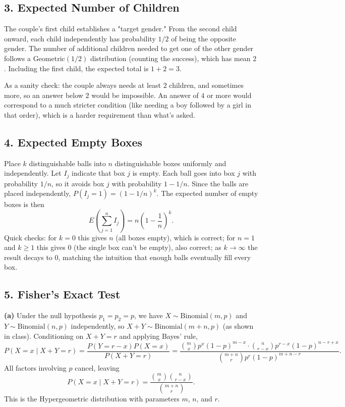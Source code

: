 \documentclass{article}
\begin{document}
\subsection*{3. Expected Number of Children}

The couple's first child establishes a "target gender." From the second child onward, each child independently has probability $1/2$ of being the opposite gender. The number of additional children needed to get one of the other gender follows a $\text{Geometric}(1/2)$ distribution (counting the success), which has mean $2$. Including the first child, the expected total is $1+2=3$.

As a sanity check: the couple always needs at least $2$ children, and sometimes more, so an answer below $2$ would be impossible. An answer of $4$ or more would correspond to a much stricter condition (like needing a boy followed by a girl in that order), which is a harder requirement than what's asked.

\subsection*{4. Expected Empty Boxes}

Place $k$ distinguishable balls into $n$ distinguishable boxes uniformly and independently. Let $I_j$ indicate that box $j$ is empty. Each ball goes into box $j$ with probability $1/n$, so it avoids box $j$ with probability $1-1/n$. Since the balls are placed independently, $P(I_j=1)=(1-1/n)^k$. The expected number of empty boxes is then
$$
E\!\left(\sum_{j=1}^{n}I_j\right)=n\left(1-\frac{1}{n}\right)^k.
$$
Quick checks: for $k=0$ this gives $n$ (all boxes empty), which is correct; for $n=1$ and $k\ge1$ this gives $0$ (the single box can't be empty), also correct; as $k\to\infty$ the result decays to $0$, matching the intuition that enough balls eventually fill every box.

\subsection*{5. Fisher's Exact Test}

\textbf{(a)} Under the null hypothesis $p_1=p_2=p$, we have $X\sim\text{Binomial}(m,p)$ and $Y\sim\text{Binomial}(n,p)$ independently, so $X+Y\sim\text{Binomial}(m+n,p)$ (as shown in class). Conditioning on $X+Y=r$ and applying Bayes' rule,
$$
P(X=x\mid X+Y=r)=\frac{P(Y=r-x)P(X=x)}{P(X+Y=r)}
=\frac{\binom{m}{x}p^x(1-p)^{m-x}\cdot\binom{n}{r-x}p^{r-x}(1-p)^{n-r+x}}{\binom{m+n}{r}p^r(1-p)^{m+n-r}}.
$$
All factors involving $p$ cancel, leaving
$$
P(X=x\mid X+Y=r)=\frac{\binom{m}{x}\binom{n}{r-x}}{\binom{m+n}{r}}.
$$
This is the Hypergeometric distribution with parameters $m$, $n$, and $r$.
\end{document}
